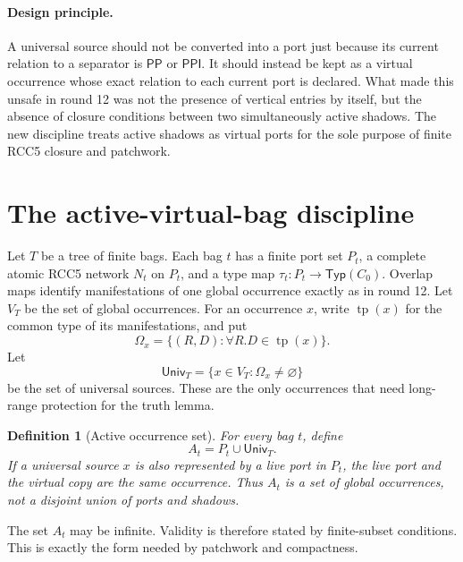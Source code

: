 \documentclass[11pt]{article}
\newtheorem{definition}[theorem]{Definition}
\newcommand{\PP}{\mathsf{PP}}
\newcommand{\PPI}{\mathsf{PPI}}
\newcommand{\tp}{\operatorname{tp}}
\newcommand{\Univ}{\mathsf{Univ}}
\newcommand{\Typ}{\mathsf{Typ}}
\begin{document}
\paragraph{Design principle.}
A universal source should not be converted into a port just because its current
relation to a separator is \(\PP\) or \(\PPI\).  It should instead be kept as a
virtual occurrence whose exact relation to each current port is declared.  What
made this unsafe in round 12 was not the presence of vertical entries by
itself, but the absence of closure conditions between two simultaneously active
shadows.  The new discipline treats active shadows as virtual ports for the
sole purpose of finite RCC5 closure and patchwork.

\section{The active-virtual-bag discipline}

Let \(T\) be a tree of finite bags.  Each bag \(t\) has a finite port set
\(P_t\), a complete atomic RCC5 network \(N_t\) on \(P_t\), and a type map
\(\tau_t:P_t\to\Typ(C_0)\).  Overlap maps identify manifestations of one global
occurrence exactly as in round 12.  Let \(V_T\) be the set of global
occurrences.  For an occurrence \(x\), write \(\tp(x)\) for the common type of
its manifestations, and put
\[
  \Omega_x=\{(R,D):\forall R.D\in\tp(x)\}.
\]
Let
\[
  \Univ_T=\{x\in V_T: \Omega_x\ne\varnothing\}
\]
be the set of universal sources.  These are the only occurrences that need
long-range protection for the truth lemma.

\begin{definition}[Active occurrence set]
For every bag \(t\), define
\[
  A_t=P_t\cup \Univ_T.
\]
If a universal source \(x\) is also represented by a live port in \(P_t\), the
live port and the virtual copy are the same occurrence.  Thus \(A_t\) is a set
of global occurrences, not a disjoint union of ports and shadows.
\end{definition}

The set \(A_t\) may be infinite.  Validity is therefore stated by finite-subset
conditions.  This is exactly the form needed by patchwork and compactness.
\end{document}
